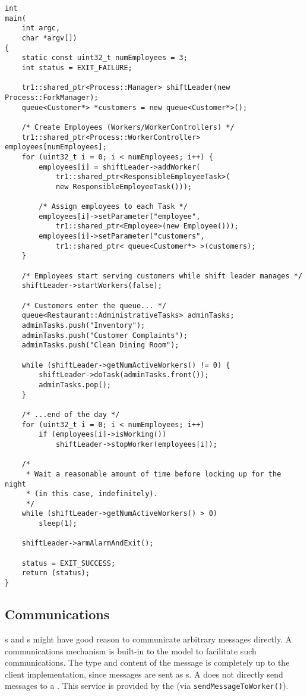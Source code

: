 \begin{lstlisting}[caption={Using \class{Manager}s and \class{WorkerController}s}, label=process_manager-example]
int
main(
    int argc,
    char *argv[])
{
	static const uint32_t numEmployees = 3;
	int status = EXIT_FAILURE;
	
	tr1::shared_ptr<Process::Manager> shiftLeader(new Process::ForkManager);
	queue<Customer*> *customers = new queue<Customer*>();
	
	/* Create Employees (Workers/WorkerControllers) */
	tr1::shared_ptr<Process::WorkerController> employees[numEmployees];
	for (uint32_t i = 0; i < numEmployees; i++) {
		employees[i] = shiftLeader->addWorker(
		    tr1::shared_ptr<ResponsibleEmployeeTask>(
		    new ResponsibleEmployeeTask()));
		
		/* Assign employees to each Task */
		employees[i]->setParameter("employee",
		    tr1::shared_ptr<Employee>(new Employee()));
		employees[i]->setParameter("customers",
		    tr1::shared_ptr< queue<Customer*> >(customers);
	}
	
	/* Employees start serving customers while shift leader manages */
	shiftLeader->startWorkers(false);
	
	/* Customers enter the queue... */
	queue<Restaurant::AdministrativeTasks> adminTasks;
	adminTasks.push("Inventory");
	adminTasks.push("Customer Complaints");
	adminTasks.push("Clean Dining Room");
	
	while (shiftLeader->getNumActiveWorkers() != 0) {
		shiftLeader->doTask(adminTasks.front());
		adminTasks.pop();
	}
	
	/* ...end of the day */
	for (uint32_t i = 0; i < numEmployees; i++)
		if (employees[i]->isWorking())
			shiftLeader->stopWorker(employees[i]);
	
	/* 
	 * Wait a reasonable amount of time before locking up for the night
	 * (in this case, indefinitely).
	 */
	while (shiftLeader->getNumActiveWorkers() > 0)
		sleep(1);
		
	shiftLeader->armAlarmAndExit();
	
	status = EXIT_SUCCESS;	
	return (status);
}

\end{lstlisting}

\subsection{Communications}
\label{subsec:communications}

s and s might have good reason to communicate
arbitrary messages directly.  A communications mechanism is built-in to the
 model to facilitate such communications. 
The type and content of the message is completely up to the client
implementation, since messages are sent as s.
A  does not directly send messages to a
.  This service is provided by the 
(via \texttt{send\-Message\-To\-Worker()}).

